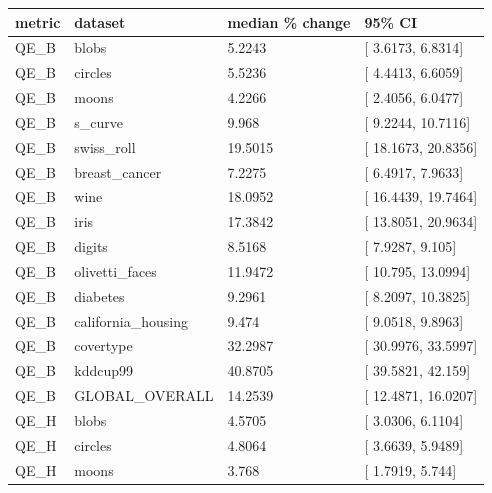 \documentclass[
]{article}
\newcounter{none} %
\providecommand{\DIFadd}[1]{{\protect\color{blue} #1}} %
\providecommand{\DIFaddbegin}{} %
\begin{document}
\DIFaddbegin {\def\LTcaptype{none} %
\begin{longtable}[]{@{}llll@{}}
\toprule\noalign{}
\DIFadd{metric }& \DIFadd{dataset }& \DIFadd{median \% change }& \DIFadd{95\% CI }\\
\midrule\noalign{}
\endhead
\bottomrule\noalign{}
\endlastfoot
\DIFadd{QE\_B }& \DIFadd{blobs }& \DIFadd{5.2243 }& {[}\DIFadd{3.6173, 6.8314}{]} \\
\DIFadd{QE\_B }& \DIFadd{circles }& \DIFadd{5.5236 }& {[}\DIFadd{4.4413, 6.6059}{]} \\
\DIFadd{QE\_B }& \DIFadd{moons }& \DIFadd{4.2266 }& {[}\DIFadd{2.4056, 6.0477}{]} \\
\DIFadd{QE\_B }& \DIFadd{s\_curve }& \DIFadd{9.968 }& {[}\DIFadd{9.2244, 10.7116}{]} \\
\DIFadd{QE\_B }& \DIFadd{swiss\_roll }& \DIFadd{19.5015 }& {[}\DIFadd{18.1673, 20.8356}{]} \\
\DIFadd{QE\_B }& \DIFadd{breast\_cancer }& \DIFadd{7.2275 }& {[}\DIFadd{6.4917, 7.9633}{]} \\
\DIFadd{QE\_B }& \DIFadd{wine }& \DIFadd{18.0952 }& {[}\DIFadd{16.4439, 19.7464}{]} \\
\DIFadd{QE\_B }& \DIFadd{iris }& \DIFadd{17.3842 }& {[}\DIFadd{13.8051, 20.9634}{]} \\
\DIFadd{QE\_B }& \DIFadd{digits }& \DIFadd{8.5168 }& {[}\DIFadd{7.9287, 9.105}{]} \\
\DIFadd{QE\_B }& \DIFadd{olivetti\_faces }& \DIFadd{11.9472 }& {[}\DIFadd{10.795, 13.0994}{]} \\
\DIFadd{QE\_B }& \DIFadd{diabetes }& \DIFadd{9.2961 }& {[}\DIFadd{8.2097, 10.3825}{]} \\
\DIFadd{QE\_B }& \DIFadd{california\_housing }& \DIFadd{9.474 }& {[}\DIFadd{9.0518, 9.8963}{]} \\
\DIFadd{QE\_B }& \DIFadd{covertype }& \DIFadd{32.2987 }& {[}\DIFadd{30.9976, 33.5997}{]} \\
\DIFadd{QE\_B }& \DIFadd{kddcup99 }& \DIFadd{40.8705 }& {[}\DIFadd{39.5821, 42.159}{]} \\
\DIFadd{QE\_B }& \DIFadd{GLOBAL\_OVERALL }& \DIFadd{14.2539 }& {[}\DIFadd{12.4871, 16.0207}{]} \\
\DIFadd{QE\_H }& \DIFadd{blobs }& \DIFadd{4.5705 }& {[}\DIFadd{3.0306, 6.1104}{]} \\
\DIFadd{QE\_H }& \DIFadd{circles }& \DIFadd{4.8064 }& {[}\DIFadd{3.6639, 5.9489}{]} \\
\DIFadd{QE\_H }& \DIFadd{moons }& \DIFadd{3.768 }& {[}\DIFadd{1.7919, 5.744}{]} \\

\end{longtable}}
\end{document}
